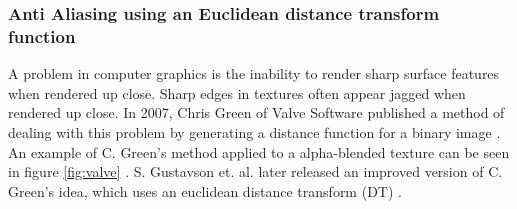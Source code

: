 \documentclass{article}
\begin{document}
\subsubsection{Anti Aliasing using an Euclidean distance transform function}
A problem in computer graphics is the inability to render sharp surface features when rendered up close. Sharp edges in textures often appear jagged when rendered up close. In 2007, Chris Green of Valve Software published a method of dealing with this problem by generating a distance function for a binary image \cite{green2007improved}. An example of C. Green's method applied to a  alpha-blended texture can be seen in figure \ref{fig:valve} \cite{green2007improved}. S. Gustavson et. al. later released an improved version of C. Green's idea, which uses an euclidean distance transform (DT) \cite{gustavson2011anti}\cite{gustavson20122d}. 
\end{document}
